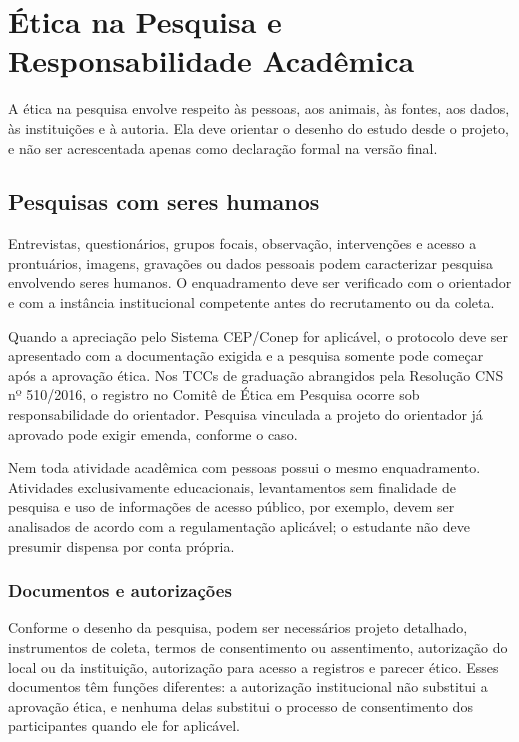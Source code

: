 \chapter{Ética na Pesquisa e Responsabilidade Acadêmica}

A ética na pesquisa envolve respeito às pessoas, aos animais, às fontes, aos dados, às instituições e à autoria. Ela deve orientar o desenho do estudo desde o projeto, e não ser acrescentada apenas como declaração formal na versão final.

\section{Pesquisas com seres humanos}

Entrevistas, questionários, grupos focais, observação, intervenções e acesso a prontuários, imagens, gravações ou dados pessoais podem caracterizar pesquisa envolvendo seres humanos. O enquadramento deve ser verificado com o orientador e com a instância institucional competente antes do recrutamento ou da coleta.

Quando a apreciação pelo Sistema CEP/Conep for aplicável, o protocolo deve ser apresentado com a documentação exigida e a pesquisa somente pode começar após a aprovação ética. Nos TCCs de graduação abrangidos pela Resolução CNS nº 510/2016, o registro no Comitê de Ética em Pesquisa ocorre sob responsabilidade do orientador. Pesquisa vinculada a projeto do orientador já aprovado pode exigir emenda, conforme o caso.

Nem toda atividade acadêmica com pessoas possui o mesmo enquadramento. Atividades exclusivamente educacionais, levantamentos sem finalidade de pesquisa e uso de informações de acesso público, por exemplo, devem ser analisados de acordo com a regulamentação aplicável; o estudante não deve presumir dispensa por conta própria.


\subsection{Documentos e autorizações}

Conforme o desenho da pesquisa, podem ser necessários projeto detalhado, instrumentos de coleta, termos de consentimento ou assentimento, autorização do local ou da instituição, autorização para acesso a registros e parecer ético. Esses documentos têm funções diferentes: a autorização institucional não substitui a aprovação ética, e nenhuma delas substitui o processo de consentimento dos participantes quando ele for aplicável.

